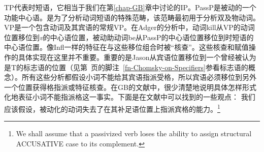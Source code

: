 TP代表时短语，它相当于我们在第\ref{chap-GB}章中讨论的IP。PassP是被动的一个功能中心语。\vPc{}是为了分析动词短语的特殊范畴，该范畴最初用于分析双及物动词\citep{Larson88a}。VP是一个包含动词及其宾语的常规VP。在Adger的分析中，动词kill从VP的动词位置移位到\textit{v}的中心语位置，被动助动词be从PassP的中心语位置移位到时短语的中心语位置。像Infl一样的特征在与这些移位组合时被“核查”。这些核查和赋值操作的具体实现在这里并不重要。重要的是Jason从宾语位置移位到一个曾经被认为是T的标志语的位置（见第~\pageref{fn-Chomsky-on-Specifiers}页的脚注~\ref{fn-Chomsky-on-Specifiers}参看标志语的概念）。所有这些分析都假设小词不能给其宾语指派受格，所以宾语必须移位到另外一个位置获得格指派或特征核查。在GB的文献中，很少清楚地说明具体怎样形式化地表征小词不能指派格这一事实。下面是在文献中可以找到的一些观点：
\eal
\ex 我们应该假设，被动化的动词失去了在其补足语位置上指派宾格的能力。\footnote{%
We shall assume that a passivized verb loses the ability to assign structural ACCUSATIVE case to
its complement.}\citep[]{Haegeman94a-u}

